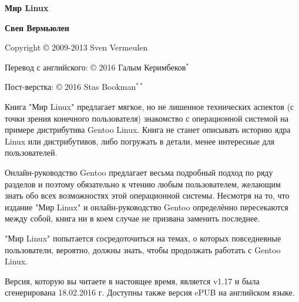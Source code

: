 \documentclass[10pt]{book}
\begin{document}


\pagestyle{empty}
\textbf{Мир Linux}

\phantom{}
\textbf{Свен Вермьюлен}

\phantom{}
Copyright © 2009-2013 Sven Vermeulen

\phantom{}
Перевод с английского: © 2016 Галым Керимбеков$^{*}$

\phantom{}
Пост-верстка: © 2016 Stas Bookman$^{**}$

\phantom{}

\phantom{}
\begin{tcolorbox}[colback=yellow!14!white]
\noindent Книга "Мир Linux"{} предлагает мягкое, но не лишенное технических аспектов (с точки зрения конечного пользователя) знакомство с операционной системой на примере дистрибутива Gentoo Linux. Книга не станет описывать историю ядра Linux или дистрибутивов, либо погружать в детали, менее интересные для пользователей.

\phantom{}
\noindent Онлайн-руководство Gentoo предлагает весьма подробный подход по ряду разделов и поэтому обязательно к чтению любым пользователем, желающим знать обо всех возможностях этой операционной системы. Несмотря на то, что издание "Мир Linux"{} и онлайн-руководство Gentoo определённо пересекаются между собой, книга ни в коем случае не призвана заменить последнее.

\phantom{}
\noindent "Мир Linux"{} попытается сосредоточиться на темах, о которых повседневные пользователи, вероятно, должны знать, чтобы продолжать работать с Gentoo Linux.

\phantom{}
\tcblower

\phantom{}
\noindent Версия, которую вы читаете в настоящее время, является v1.17 и была сгенерирована 18.02.2016 г. Доступны также версия ePUB на английском языке.
\end{tcolorbox}

\tableofcontents %

\newpage
\end{document}
